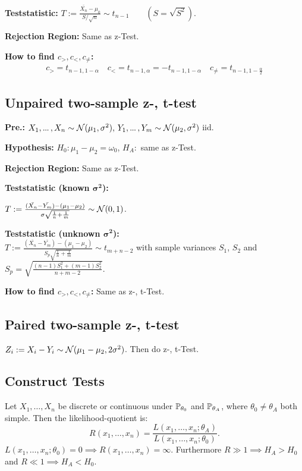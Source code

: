 \textbf{Teststatistic:} \(T := \frac{\bar{X_n} - \mu_0}{S / \sqrt{n}} \sim t_{n-1} \qquad (S = \sqrt{S^2})\).

\textbf{Rejection Region:} Same as z-Test.

\textbf{How to find \(c_>, c_<, c_{\neq}\):}
\begin{align*}
  c_> = t_{n-1, 1 - \alpha} \quad c_< = t_{n-1, \alpha} = -t_{n-1, 1-\alpha} \quad c_{\neq} = t_{n-1, 1 - \frac{\alpha}{2}}
\end{align*}

\subsection{Unpaired two-sample z-, t-test}
\textbf{Pre.:} \(X_1, \sdots, X_{n} \sim \Normal(\mu_1, \sigma^2), \, Y_1, \sdots, Y_{m} \sim \Normal(\mu_2, \sigma^2)\) iid.

\textbf{Hypothesis:} \(H_0: \mu_1 - \mu_2 = \omega_0\), \(H_A:\) same as z-Test.

\textbf{Rejection Region:} Same as z-Test.

\textbf{Teststatistic (known \(\bm{\sigma^2}\)):}
\begin{center}
  \(T := \frac{(\bar{X_{n}} - \bar{Y_{m}}) - (\mu_1 - \mu_2)}{\sigma\sqrt{\frac{1}{n} + \frac{1}{m}}} \sim \Normal(0, 1)\).
\end{center}

\textbf{Teststatistic (unknown \(\bm{\sigma^2}\)):} \\
\(T := \frac{(\bar{X_{n}} - \bar{Y_{m}}) - (\mu_1 - \mu_2)}{S_p\sqrt{\frac{1}{n} + \frac{1}{m}}} \sim t_{m + n - 2}\) with sample variances \(S_1\), \(S_2\) and 
\(S_p = \sqrt{\frac{(n - 1)S_1^2 + (m - 1)S_2^2}{n + m - 2}}\).

\textbf{How to find \(c_>, c_<, c_{\neq}\):} Same as z-, t-Test.

\subsection{Paired two-sample z-, t-test}
\(Z_i := X_i - Y_i \sim \Normal(\mu_1 - \mu_2, 2\sigma^2)\). Then do z-, t-Test.

\subsection{Construct Tests}
Let \(X_1, \ldots, X_n\) be discrete or continuous under \(\P_{\theta_0}\) and \(\P_{\theta_A}\), where \(\theta_0 \neq \theta_A\) both simple. Then the likelihood-quotient is: \vspace{-7pt}
\[R(x_1, \ldots, x_n) = \frac{L(x_1, \ldots, x_n; \theta_A)}{L(x_1, \ldots, x_n; \theta_0)}.\]
\(L(x_1, \ldots, x_n; \theta_0) = 0 \implies R(x_1, \ldots, x_n) = \infty\). Furthermore \(R \gg 1 \implies H_A > H_0\) and \(R \ll 1 \implies H_A < H_0\).


